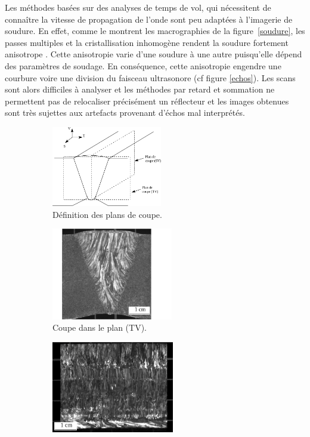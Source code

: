 Les méthodes basées sur des analyses de temps de vol, qui nécessitent de connaître la vitesse de propagation de l'onde sont peu adaptées à l'imagerie de soudure. En effet, comme le montrent les macrographies de la figure~\ref{soudure}, les passes multiples et la cristallisation inhomogène rendent la soudure fortement anisotrope \citep{chassignole}. Cette anisotropie varie d'une soudure à une autre puisqu'elle dépend des paramètres de soudage. En conséquence, cette anisotropie engendre une courbure voire une division du faisceau ultrasonore (cf figure \ref{echos}). Les scans sont alors difficiles à analyser et les méthodes par retard et sommation ne permettent pas de relocaliser précisément un réflecteur et les images obtenues sont très sujettes aux artefacts provenant d'échos mal interprétés.

\begin{figure}[!h]
	\hspace{-2cm}
    \centering
    \begin{subfigure}[c]{0.25\textwidth}
    	\centering
        \includegraphics[height=3.5cm]{./img/soudure3.png}
        \vspace{0.03cm}
        \caption{ Définition des plans de coupe.}
    \end{subfigure}
    \hspace{1cm}
    \begin{subfigure}[c]{0.25\textwidth}
    	\centering
        \includegraphics[height=4cm]{./img/soudure1.png}
        \caption{ Coupe dans le plan (TV).}
    \end{subfigure}
        \hspace{1.5cm}
    \begin{subfigure}[c]{0.25\textwidth}
    	\centering
		\includegraphics[height=4cm]{./img/soudure2.png}

\end{subfigure}
\end{figure}
